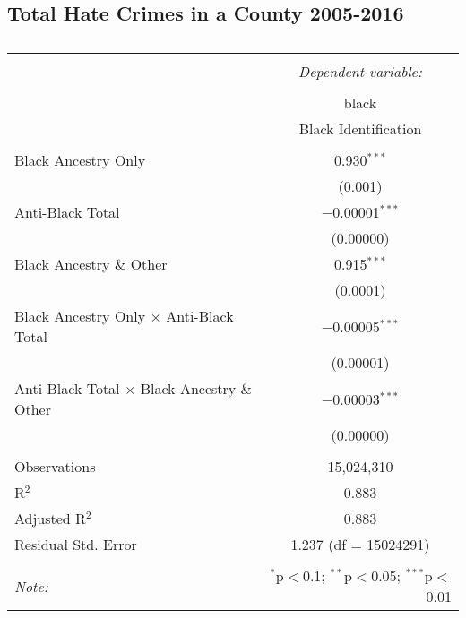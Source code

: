 \documentclass{article}
\begin{document}
\subsection{Total Hate Crimes in a County 2005-2016}
    \begin{table}[!htbp] \centering 
      \caption{} 
      \label{} 
    \begin{tabular}{@{\extracolsep{5pt}}lc} 
    \\[-1.8ex]\hline 
    \hline \\[-1.8ex] 
     & \multicolumn{1}{c}{\textit{Dependent variable:}} \\ 
    \cline{2-2} 
    \\[-1.8ex] & black \\ 
     & Black Identification \\ 
    \hline \\[-1.8ex] 
     Black Ancestry Only & 0.930$^{***}$ \\ 
      & (0.001) \\ 
     Anti-Black Total & $-$0.00001$^{***}$ \\ 
      & (0.00000) \\ 
     Black Ancestry \& Other & 0.915$^{***}$ \\ 
      & (0.0001) \\ 
     Black Ancestry Only $\times$ Anti-Black Total & $-$0.00005$^{***}$ \\ 
      & (0.00001) \\ 
     Anti-Black Total $\times$ Black Ancestry \& Other & $-$0.00003$^{***}$ \\ 
      & (0.00000) \\ 
    \hline \\[-1.8ex] 
    Observations & 15,024,310 \\ 
    R$^{2}$ & 0.883 \\ 
    Adjusted R$^{2}$ & 0.883 \\ 
    Residual Std. Error & 1.237 (df = 15024291) \\ 
    \hline 
    \hline \\[-1.8ex] 
    \textit{Note:}  & \multicolumn{1}{r}{$^{*}$p$<$0.1; $^{**}$p$<$0.05; $^{***}$p$<$0.01} \\ 
    \end{tabular} 
    \end{table} 




\newpage    
\end{document}
